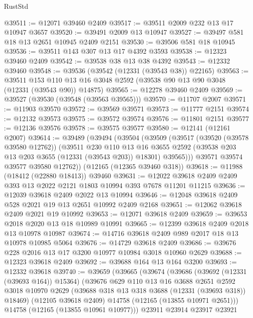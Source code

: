 \begin{lexlean}{RustStd}
\begin{coremodule}
@39511 := @12071 @39460 @2409
@39517 := @39511 @2009 @232 @13 @17 @10947 @3657
@39520 := @39491 @2009 @13 @10947
@39527 := @39497 @581 @18 @13 @2651 @10945 @2409 @2151
@39530 := @39506 @581 @18 @10945
@39536 := @39511 @143 @307 @13 @17 @4392 @3593
@39538 := @12323 @39460 @2409
@39542 := @39538 @38 @13 @38 @4392
@39543 := @12332 @39460
@39548 := @39536 (@39542 (@12331 (@39543 @38)) @22165)
@39563 := @39511
    @153
    @110
    @13
    @16
    @3048
    @2592
    (@39538 @90 @13 @90 @3048 (@12331 (@39543 @90)) @14875)
@39565 := @12278 @39460 @2409
@39569 := @39527 (@39530 (@39548 (@39563 @39565)))
@39570 := @11707 @2007
@39571 := @11903 @39570
@39572 := @39569 @39571
@39573 := @11777 @2151
@39574 := @12132 @39573
@39575 := @39572 @39574
@39576 := @11801 @2151
@39577 := @12136 @39576
@39578 := @39575 @39577
@39580 := @12141 (@12161 @2007)
@39614 := @39489
    (@39494
      (@39504
        (@39509
          (@39517
            (@39520 (@39578 @39580 @12762))
            (@39511
              @230
              @110
              @13
              @16
              @3655
              @2592
              (@39538 @203 @13 @203 @3655 (@12331 (@39543 @203)) @18301)
              @39565)))
        @39571
        @39574
        @39577
        @39580
        @12762))
    (@12165 (@12365 @39460 @318))
@39618 := @11988 (@18412 (@22880 @18413)) @39460
@39631 := @12022 @39618 @2409 @2409 @393 @13 @2022 @2121 @1803 @10994 @393 @7678 @11201 @11215
@39636 := @12039 @39618 @2409 @2022 @13 @10994
@39646 := @12048 @39618 @2409 @528 @2021 @19 @13 @2651 @10992 @2409 @2168
@39651 := @12062 @39618 @2409 @2021 @19 @10992
@39653 := @12071 @39618 @2409
@39659 := @39653 @2018 @2020 @13 @18 @10989 @10991
@39665 := @12399 @39618 @2409 @2018 @13 @10978 @10987
@39674 := @14716 @39618 @2409 @989 @2017 @18 @13 @10978 @10985 @5064
@39676 := @14729 @39618 @2409
@39686 := @39676 @228 @2016 @13 @17 @3200 @10977 @10984 @3018 @10960 @2629
@39688 := @12323 @39618 @2409
@39692 := @39688 @164 @13 @164 @3200
@39693 := @12332 @39618
@39740 := @39659
    (@39665
      (@39674
        (@39686
          (@39692 (@12331 (@39693 @164)) @15364)
          (@39676
            @629
            @110
            @13
            @16
            @3688
            @2651
            @2592
            @3018
            @10970
            @2629
            (@39688 @318 @13 @318 @3688 (@12331 (@39693 @318)) @18469)
            (@12105 @39618 @2409)
            @14758
            (@12165 (@13855 @10971 @2651)))
          @14758
          (@12165 (@13855 @10961 @10977)))
        @23911
        @23914
        @23917
        @23921

\end{coremodule}
\end{lexlean}

